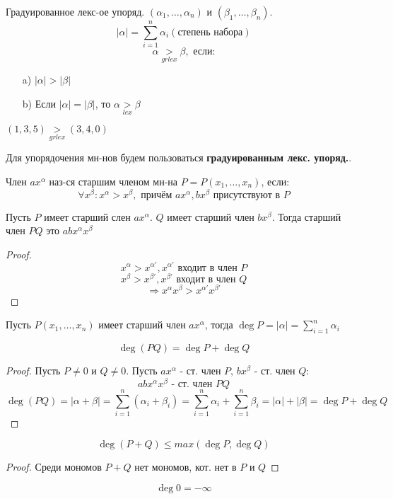 \begin{example}
Градуированное лекс-ое упоряд. $(\alpha_1, \ldots, \alpha_n)$ и $(\beta_1, \ldots, \beta_n)$.
\[
\left|\alpha\right| = \sum_{i = 1}^{n} \alpha_i (\text{степень набора})
\]
\[
\alpha \underset{grlex}{>} \beta, \text{ если:}
\]
\begin{itemize}
  \item [a) ] $\left|\alpha\right| > \left|\beta\right|$
  \item [b) ] Если $\left|\alpha\right| = \left|\beta\right|$, то $\alpha \underset{lex}{>} \beta$
\end{itemize}
\begin{example}
$(1, 3, 5) \underset{grlex}{>} (3, 4, 0)$
\end{example}
\end{example}
Для упорядочения мн-нов будем пользоваться \textbf{градуированным лекс. упоряд.}.
\begin{definition}
Член $a x^{\alpha}$ наз-ся старшим членом мн-на $P = P(x_1, \ldots, x_n)$, если:
\[
\forall x^{\beta} \colon x^{\alpha} > x^{\beta}, \text{ причём $ax^{\alpha}, bx^{\beta}$ присутствуют в $P$}
\]
\end{definition} 
\begin{statement}
Пусть $P$ имеет старший слен $ax^{\alpha}$. $Q$ имеет старший член $bx^{\beta}$. Тогда старший член $PQ$ это $ab x^{\alpha}x^{\beta}$
\end{statement}
\begin{proof}
\[
x^{\alpha} > x^{\alpha'}, x^{\alpha'} \text{ входит в член $P$}
\]
\[
x^{\beta} > x^{\beta'}, x^{\beta'} \text{ входит в член $Q$}
\]
\[
\Rightarrow x^{\alpha}x^{\beta} > x^{\alpha'}x^{\beta'}
\]
\end{proof}
\begin{definition}
Пусть $P(x_1, \ldots, x_n)$ имеет старший член $ax^{\alpha}$, тогда $\deg P = \left|\alpha\right| = \sum_{i = 1}^{n} \alpha_i$
\end{definition}
\begin{consequence}
\[
\deg (PQ) = \deg P + \deg Q
\]
\end{consequence}
\begin{proof}
Пусть $P \neq 0$ и $Q \neq 0$. Пусть $ax^{\alpha}$ - ст. член $P$, $bx^{\beta}$ - ст. член $Q$:
\[
ab x^{\alpha}x^{\beta} \text{ - ст. член $PQ$}
\]
\[
\deg (PQ) = \left|\alpha + \beta\right| = \sum_{i = 1}^{n} (\alpha_i + \beta_i) = \sum_{i = 1}^{n} \alpha_i + \sum_{i = 1}^{n} \beta_i = \left|\alpha\right| + \left|\beta\right| = \deg P + \deg Q
\]
\end{proof}
\begin{consequence}
\[
\deg (P + Q) \leq max(\deg P, \deg Q)
\]
\end{consequence}
\begin{proof}
Среди мономов $P + Q$ нет мономов, кот. нет в $P$ и $Q$
\end{proof}
\begin{note}
\[
\deg 0 = -\infty
\]
\end{note}
